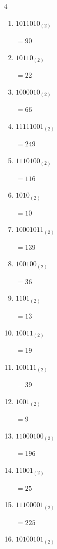 \begin{multicols}{4}
\begin{enumerate}
        $=95$

  \item $1011010_{(2)}$

        $=90$

  \item $10110_{(2)}$

        $=22$

  \item $1000010_{(2)}$

        $=66$

  \item $11111001_{(2)}$

        $=249$

  \item $1110100_{(2)}$

        $=116$

  \item $1010_{(2)}$

        $=10$

  \item $10001011_{(2)}$

        $=139$

  \item $100100_{(2)}$

        $=36$

  \item $1101_{(2)}$

        $=13$

  \item $10011_{(2)}$

        $=19$

  \item $100111_{(2)}$

        $=39$

  \item $1001_{(2)}$

        $=9$

  \item $11000100_{(2)}$

        $=196$

  \item $11001_{(2)}$

        $=25$

\columnbreak %

  \item $11100001_{(2)}$

        $=225$

  \item $10100101_{(2)}$


\end{enumerate}
\end{multicols}
